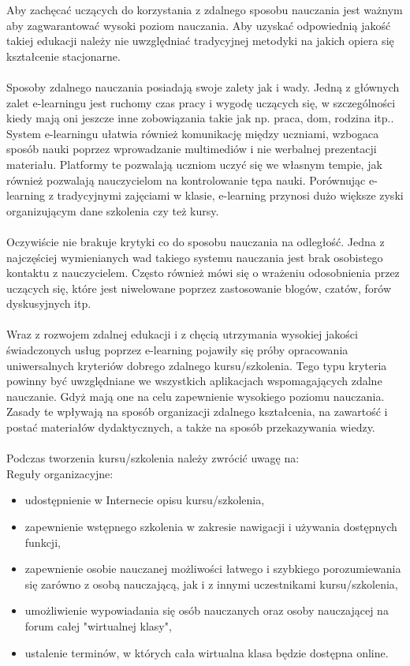 Aby zachęcać uczących do korzystania z zdalnego sposobu nauczania jest ważnym aby zagwarantować wysoki poziom nauczania. Aby uzyskać odpowiednią jakość takiej edukacji należy nie uwzględniać tradycyjnej metodyki na jakich opiera się kształcenie stacjonarne. \\
\ \\
Sposoby zdalnego nauczania posiadają swoje zalety jak i wady. Jedną z głównych zalet e-learningu jest ruchomy czas pracy i wygodę uczących się, w szczególności kiedy mają oni jeszcze inne zobowiązania takie jak np. praca, dom, rodzina itp.. System e-learningu ułatwia również komunikację między uczniami, wzbogaca sposób nauki poprzez wprowadzanie multimediów i nie werbalnej prezentacji materiału. Platformy te pozwalają uczniom uczyć się we własnym tempie, jak również pozwalają nauczycielom na kontrolowanie tępa nauki. Porównując e-learning z tradycyjnymi zajęciami w klasie, e-learning przynosi dużo większe zyski organizującym dane szkolenia czy też kursy. \\
\ \\
Oczywiście nie brakuje krytyki co do sposobu nauczania na odległość. Jedna z najczęściej wymienianych wad takiego systemu nauczania jest brak osobistego kontaktu z nauczycielem. Często również mówi się o wrażeniu odosobnienia przez uczących się, które jest niwelowane poprzez zastosowanie blogów, czatów, forów dyskusyjnych itp.\\
\ \\
Wraz z rozwojem zdalnej edukacji i z chęcią utrzymania wysokiej jakości świadczonych usług poprzez e-learning pojawiły się próby opracowania uniwersalnych kryteriów dobrego zdalnego kursu/szkolenia. Tego typu kryteria powinny być uwzględniane we wszystkich aplikacjach wspomagających zdalne nauczanie. Gdyż mają one na celu zapewnienie wysokiego poziomu nauczania. Zasady te wpływają na sposób organizacji zdalnego kształcenia, na zawartość i postać materiałów dydaktycznych, a także na sposób przekazywania wiedzy. \\
\ \\
Podczas tworzenia kursu/szkolenia należy zwrócić uwagę na: \\
Reguły organizacyjne: \\
	\begin{itemize}
		\item udostępnienie w Internecie opisu kursu/szkolenia,
		\item zapewnienie wstępnego szkolenia w zakresie nawigacji i używania dostępnych funkcji, 
		\item zapewnienie osobie nauczanej możliwości łatwego i szybkiego porozumiewania się zarówno z osobą nauczającą, jak i z innymi uczestnikami kursu/szkolenia, 
		\item umożliwienie wypowiadania się osób nauczanych oraz osoby nauczającej na forum całej "wirtualnej klasy", 
		\item ustalenie terminów, w których cała wirtualna klasa będzie dostępna online. 
	\end{itemize} 
